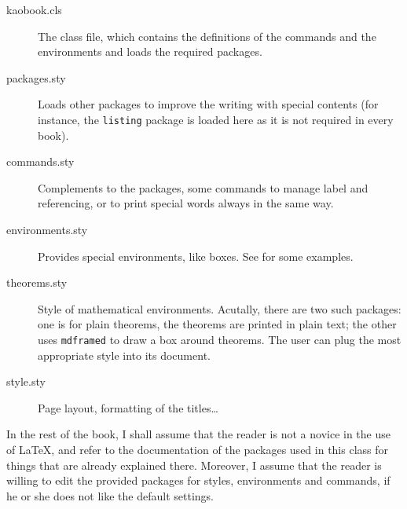 \begin{description}
	\item[kaobook.cls] The class file, which contains the definitions of 
		the commands and the environments and loads the required 
		packages.
	\item[packages.sty] Loads other packages to improve the writing with 
		special contents (for instance, the \verb|listing| package is 
		loaded here as it is not required in every book).
	\item[commands.sty] Complements to the packages, \eg some commands 
		to manage label and referencing, or to print special words 
		always in the same way.
	\item[environments.sty] Provides special environments, like boxes. 
		See  for some examples.
	\item[theorems.sty] Style of mathematical environments. Acutally, 
		there are two such packages: one is for plain theorems, \ie the 
		theorems are printed in plain text; the other uses 
		\verb|mdframed| to draw a box around theorems. The user can plug 
		the most appropriate style into its document.
	\item[style.sty] Page layout, formatting of the titles\ldots
\end{description}


In the rest of the book, I shall assume that the reader is not a novice 
in the use of \LaTeX, and refer to the documentation of the packages 
used in this class for things that are already explained there. 
Moreover, I assume that the reader is willing to edit the provided 
packages for styles, environments and commands, if he or she does not 
like the default settings.
